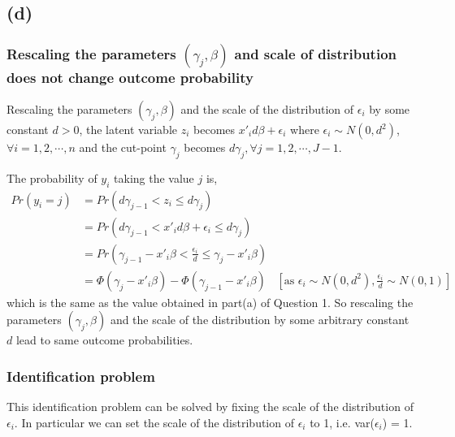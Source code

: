 \documentclass[a4paper]{article}
\begin{document}
\subsection*{(d)}

\subsubsection*{Rescaling the parameters $(\gamma_j,\beta)$ and scale of distribution does not change outcome probability}

Rescaling the parameters $(\gamma_j,\beta)$ and the scale of the distribution of $\epsilon_i$ by some constant $d > 0$, the latent variable $z_i$ becomes $x'_id\beta + \epsilon_i$ where $\epsilon_i \sim N(0,d^2)$, $\forall i = 1,2,\cdots,n$ and the cut-point $\gamma_j$ becomes $d\gamma_j, \forall j = 1, 2, \cdots, J-1$.
\vspace{0.25cm}

\noindent The probability of $y_i$ taking the value $j$ is,
\begin{align*}
    Pr(y_i=j) &= Pr(d\gamma_{j-1} < z_i \leq d\gamma_j) \\
              &= Pr(d\gamma_{j-1} < x'_i d\beta + \epsilon_i \leq d\gamma_j)\\
              &= Pr(\gamma_{j-1} - x'_i\beta < \frac{\epsilon_i}{d} \leq \gamma_j - x'_i\beta)\\
              &= \Phi(\gamma_j - x'_i\beta) - \Phi(\gamma_{j-1} - x'_i\beta) & [\text{as } \epsilon_i \sim N(0,d^2), \frac{\epsilon_i}{d} \sim N(0,1)]
\end{align*}
which is the same as the value obtained in part(a) of Question 1. So rescaling the parameters $(\gamma_j,\beta)$ and the scale of the distribution by some arbitrary constant $d$ lead to same outcome probabilities.

\subsubsection*{Identification problem}
This identification problem can be solved by fixing the scale of the distribution of $\epsilon_i$. In particular we can set the scale of the distribution of $\epsilon_i$ to 1, i.e. var($\epsilon_i$) = 1.

\pagebreak
\end{document}

